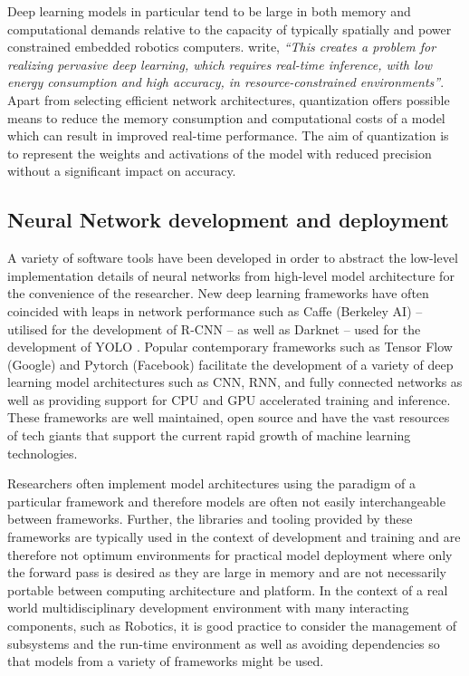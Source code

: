 \documentclass[a4paper,twoside,12pt]{report}
\begin{document}
Deep learning models in particular tend to be large in both memory and computational demands relative to the capacity of typically spatially and power constrained embedded robotics computers. \cite{quantization} write, \textit{``This creates a problem for realizing pervasive deep learning, which requires real-time inference, with low energy consumption and high accuracy, in resource-constrained environments''}. Apart from selecting efficient network architectures, quantization offers possible means to reduce the memory consumption and computational costs of a model which can result in improved real-time performance. The aim of quantization is to represent the weights and activations of the model with reduced precision without a significant impact on accuracy. 

\subsection{Neural Network development and deployment}

A variety of software tools have been developed in order to abstract the low-level implementation details of neural networks from high-level model architecture for the convenience of the researcher. New deep learning frameworks have often coincided with leaps in network performance such as Caffe (Berkeley AI) \citep{caffe} -- utilised for the development of R-CNN \citep{rcnn} -- as well as Darknet -- used for the development of YOLO \citep{yolo}. Popular contemporary frameworks such as Tensor Flow (Google) \citep{tensorflow} and Pytorch (Facebook) \citep{pytorch} facilitate the development of a variety of deep learning model architectures such as CNN, RNN, and fully connected networks as well as providing support for CPU and GPU accelerated training and inference. These frameworks are well maintained, open source and have the vast resources of tech giants that support the current rapid growth of machine learning technologies.

Researchers often implement model architectures using the paradigm of a particular framework and therefore models are often not easily interchangeable between frameworks. Further, the libraries and tooling provided by these frameworks are typically used in the context of development and training and are therefore not optimum environments for practical model deployment where only the forward pass is desired as they are large in memory and are not necessarily portable between computing architecture and platform. In the context of a real world multidisciplinary development environment with many interacting components, such as Robotics, it is good practice to consider the management of subsystems and the run-time environment as well as avoiding dependencies so that models from a variety of frameworks might be used. 
\end{document}
